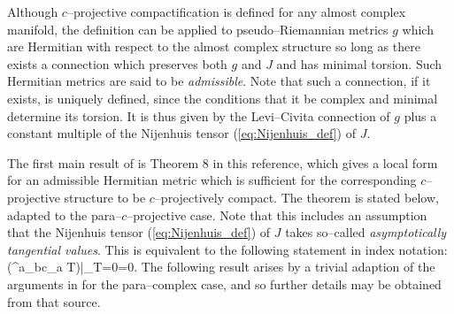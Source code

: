 
Although $c$--projective compactification is defined for any almost complex manifold, the definition can be applied to pseudo--Riemannian metrics $g$ which are Hermitian with respect to the almost complex structure so long as there exists a connection which preserves both $g$ and $J$ and has minimal torsion. Such Hermitian metrics are said to be \textit{admissible}.  Note that such a connection, if it exists, is uniquely defined, since the conditions that it be complex and minimal determine its torsion. It is thus given by the Levi--Civita connection of $g$ plus a constant multiple of the Nijenhuis tensor (\ref{eq:Nijenhuis_def}) of $J$.

The first main result of \cite{CG} is  Theorem 8 in this reference, which gives a local form for an admissible Hermitian metric which is sufficient for the corresponding $c$--projective structure to be $c$--projectively compact. The theorem is stated below, adapted to the para--$c$--projective case. Note that this includes an assumption that the Nijenhuis tensor (\ref{eq:Nijenhuis_def}) of $J$ takes so--called \textit{asymptotically tangential values}. This is equivalent to the following statement in index notation:
\be
\label{Nijenhuis_condition}
\Big({^{a}}_{bc}\nabla_a T\Big)\Big|_{T=0}=0.  \ee
The
following result arises by a trivial adaption of the arguments in
\cite{CG} for the para--complex case, and so further details may be obtained from that source.

